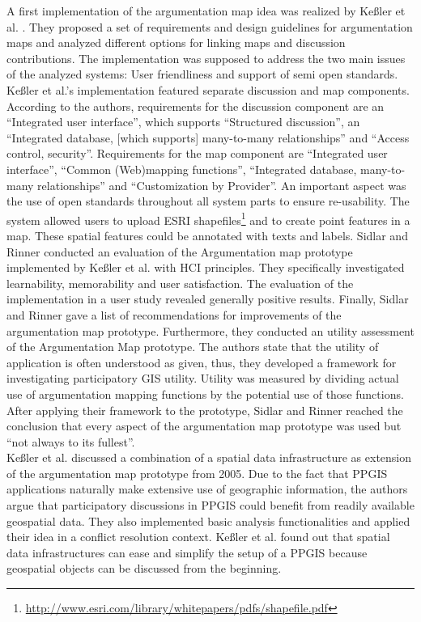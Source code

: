 A first implementation of the argumentation map idea was realized by Ke{\ss}ler et al. \cite{Kessler2005_ArgumentationMapPrototype}. They proposed a set of requirements and design guidelines for argumentation maps and analyzed different options for linking maps and discussion contributions. The implementation was supposed to address the two main issues of the analyzed systems: User friendliness and support of semi open standards. Ke{\ss}ler et al.'s implementation featured separate discussion and map components. According to the authors, requirements for the discussion component are an ``Integrated user interface'', which supports ``Structured discussion'', an ``Integrated database, [which supports] many-to-many relationships'' and ``Access control, security''. Requirements for the map component are ``Integrated user interface'', ``Common (Web)mapping functions'', ``Integrated database, many-to-many relationships'' and ``Customization by Provider''. An important aspect was the use of open standards throughout all system parts to ensure re-usability. The system allowed users to upload ESRI shapefiles\footnote{\url{http://www.esri.com/library/whitepapers/pdfs/shapefile.pdf}} and to create point features in a map. These spatial features could be annotated with texts and labels. Sidlar and Rinner \cite{sidlar_argumap_2007} conducted an evaluation of the Argumentation map prototype implemented by Ke{\ss}ler et al. with HCI principles. They specifically investigated learnability, memorability and user satisfaction. The evaluation of the implementation in a user study revealed generally positive results. Finally, Sidlar and Rinner gave a list of recommendations for improvements of the argumentation map prototype. Furthermore, they conducted an utility assessment \cite{Sidlar2009-AssessmentMapGeocollaborationTool} of the Argumentation Map prototype. The authors state that the utility of application is often understood as given, thus, they developed a framework for investigating participatory GIS utility. Utility was measured by dividing actual use of argumentation mapping functions by the potential use of those functions. After applying their framework to the prototype, Sidlar and Rinner reached the conclusion that every aspect of the argumentation map prototype was used but ``not always to its fullest''.\\
Ke{\ss}ler et al. \cite{Kessler2005_Conflict_Resolution} discussed a combination of a spatial data infrastructure as extension of the argumentation map prototype from 2005. Due to the fact that PPGIS applications naturally make extensive use of geographic information, the authors argue that participatory discussions in PPGIS could benefit from readily available geospatial data. They also implemented basic analysis functionalities and applied their idea in a conflict resolution context. Ke{\ss}ler et al. found out that spatial data infrastructures can ease and simplify the setup of a PPGIS because geospatial objects can be discussed from the beginning.\\
